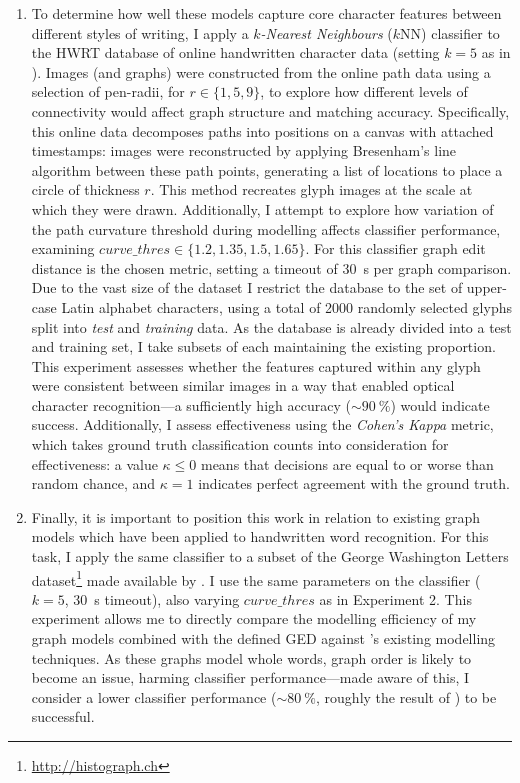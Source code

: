 \documentclass{mpaper}
\begin{document}
\begin{enumerate}
	\item To determine how well these models capture core character features between different styles of writing, I apply a \emph{$k$-Nearest Neighbours} ($k$NN) classifier to the HWRT database of online handwritten character data \cite{HwrtDatabase} (setting $k=5$ as in \cite{Graphs-Handwriting}).
	Images (and graphs) were constructed from the online path data using a selection of pen-radii, for $r \in \{1,5,9\}$, to explore how different levels of connectivity would affect graph structure and matching accuracy.
	Specifically, this online data decomposes paths into positions on a canvas with attached timestamps: images were reconstructed by applying Bresenham's line algorithm between these path points, generating a list of locations to place a circle of thickness $r$.
	This method recreates glyph images at the scale at which they were drawn.
	Additionally, I attempt to explore how variation of the path curvature threshold during modelling affects classifier performance, examining $\mathit{curve\_thres} \in \{1.2, 1.35, 1.5, 1.65\}$.
	For this classifier graph edit distance is the chosen metric, setting a timeout of \SI{30}{\second} per graph comparison.
	Due to the vast size of the dataset I restrict the database to the set of upper-case Latin alphabet characters, using a total of 2000 randomly selected glyphs split into \emph{test} and \emph{training} data.
	As the database is already divided into a test and training set, I take subsets of each maintaining the existing proportion.
	This experiment assesses whether the features captured within any glyph were consistent between similar images in a way that enabled optical character recognition---a sufficiently high accuracy ($\sim\SI{90}{\percent}$) would indicate success.
	Additionally, I assess effectiveness using the \emph{Cohen's Kappa} metric, which takes ground truth classification counts into consideration for effectiveness: a value $\kappa\le0$ means that decisions are equal to or worse than random chance, and $\kappa=1$ indicates perfect agreement with the ground truth.
	
	\item Finally, it is important to position this work in relation to existing graph models which have been applied to handwritten word recognition.
	For this task, I apply the same classifier to a subset of the George Washington Letters dataset\footnote{\url{http://histograph.ch}} made available by \citeauthor{Graphs-Handwriting} \cite{Graphs-Handwriting}.
	I use the same parameters on the classifier ($k=5$, \SI{30}{\second} timeout), also varying $\mathit{curve\_thres}$ as in Experiment 2.
	This experiment allows me to directly compare the modelling efficiency of my graph models combined with the defined GED against \citeauthor{Graphs-Handwriting}'s existing modelling techniques.
	As these graphs model whole words, graph order is likely to become an issue, harming classifier performance---made aware of this, I consider a lower classifier performance ($\sim\SI{80}{\percent}$, roughly the result of \citeauthor{Graphs-Handwriting}) to be successful.
\end{enumerate}
\end{document}
